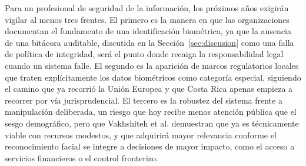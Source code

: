 Para un profesional de seguridad de la información, los próximos años
exigirán vigilar al menos tres frentes. El primero es la manera en que
las organizaciones documentan el fundamento de una identificación
biométrica, ya que la ausencia de una bitácora auditable, discutida en
la Sección~\ref{sec:discusion} como una falla de política de
integridad, será el punto donde recaiga la responsabilidad legal
cuando un sistema falle. El segundo es la aparición de marcos
regulatorios locales que traten explícitamente los datos biométricos
como categoría especial, siguiendo el camino que ya recorrió la Unión
Europea y que Costa Rica apenas empieza a recorrer por vía
jurisprudencial. El tercero es la robustez del sistema frente a
manipulación deliberada, un riesgo que hoy recibe menos atención
pública que el sesgo demográfico, pero que Vakhshiteh et al.
demuestran que ya es técnicamente viable con recursos modestos, y que
adquirirá mayor relevancia conforme el reconocimiento facial se
integre a decisiones de mayor impacto, como el acceso a servicios
financieros o el control fronterizo.